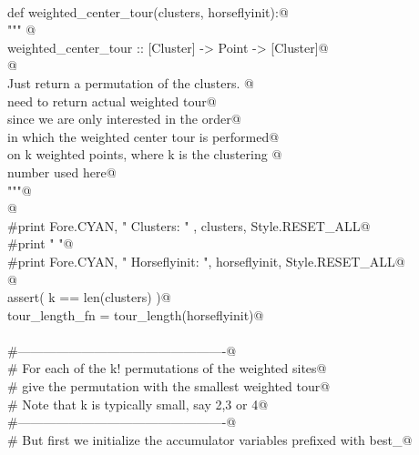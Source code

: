 \documentclass[11.5pt]{report}
\begin{document}
\begin{flushleft}
\begin{list}{}{}
\mbox{}\verb@@\\
\mbox{}\verb@     def  weighted_center_tour(clusters, horseflyinit):@\\
\mbox{}\verb@         """ @\\
\mbox{}\verb@         weighted_center_tour :: [Cluster] -> Point -> [Cluster]@\\
\mbox{}\verb@         @\\
\mbox{}\verb@         Just return a permutation of the clusters. @\\
\mbox{}\verb@         need to return actual weighted tour@\\
\mbox{}\verb@         since we are only interested in the order@\\
\mbox{}\verb@         in which the weighted center tour is performed@\\
\mbox{}\verb@         on k weighted points, where k is the clustering @\\
\mbox{}\verb@         number used here@\\
\mbox{}\verb@         """@\\
\mbox{}\verb@         @\\
\mbox{}\verb@         #print Fore.CYAN, " Clusters: "    , clusters, Style.RESET_ALL@\\
\mbox{}\verb@         #print " "@\\
\mbox{}\verb@         #print Fore.CYAN, " Horseflyinit: ", horseflyinit, Style.RESET_ALL@\\
\mbox{}\verb@         @\\
\mbox{}\verb@         assert( k == len(clusters) )@\\
\mbox{}\verb@         tour_length_fn = tour_length(horseflyinit)@\\
\mbox{}\verb@@\\
\mbox{}\verb@         #-------------------------------------------------@\\
\mbox{}\verb@         # For each of the k! permutations of the weighted sites@\\
\mbox{}\verb@         # give the permutation with the smallest weighted tour@\\
\mbox{}\verb@         # Note that k is typically small, say 2,3 or 4@\\
\mbox{}\verb@         #-------------------------------------------------@\\
\mbox{}\verb@         # But first we initialize the accumulator variables prefixed with best_@\\
\mbox{}\verb@@\\

\end{list}
\end{flushleft}
\end{document}
